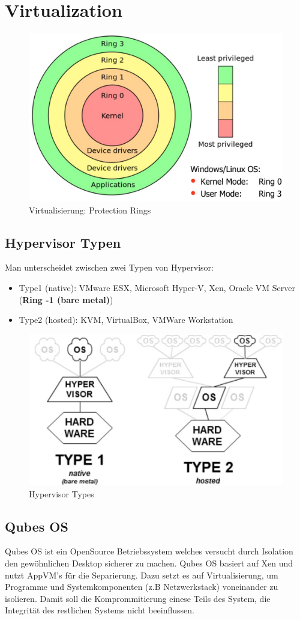 \section{Virtualization}
\begin{figure}[h]
\centering
\includegraphics[width=0.5\linewidth]{images/virtualization_rings}
\caption{Virtualisierung: Protection Rings}
\label{fig:virtualizationrings}
\end{figure}

\subsection{Hypervisor Typen}
Man unterscheidet zwischen zwei Typen von Hypervisor:

\begin{itemize}
	\item Type1 (native): VMware ESX, Microsoft Hyper-V, Xen, Oracle VM Server (\textbf{Ring -1 (bare metal)})
	\item Type2 (hosted): KVM, VirtualBox, VMWare Workstation
\end{itemize}

\begin{figure}[h]
\centering
\includegraphics[width=0.5\linewidth]{images/hypervisor_types}
\caption{Hypervisor Types}
\label{fig:hypervisortypes}
\end{figure}

\subsection{Qubes OS}
Qubes OS ist ein OpenSource Betriebssystem welches versucht durch Isolation den gewöhnlichen Desktop sicherer zu machen. Qubes OS basiert auf Xen und nutzt AppVM's für die Separierung. Dazu setzt es auf Virtualisierung, um Programme und Systemkomponenten (z.B Netzwerkstack) voneinander zu isolieren. Damit soll die Komprommitierung einese Teils des System, die Integrität des restlichen Systems nicht beeinflussen. 

